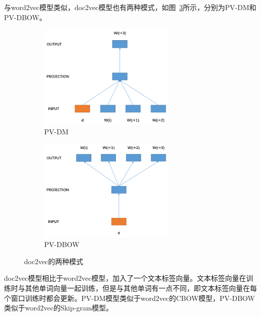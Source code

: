 与word2vec模型类似，doc2vec模型也有两种模式，如图~\ref{fig:doc2vec}所示，分别为PV-DM和PV-DBOW。\par


\begin{figure}[t]
  \begin{subfigure}[t]{0.5\linewidth}  
    \centering
    \includegraphics[width=6.5cm]{dm.png}

    \caption{PV-DM}
    \label{fig:jaccard}
  \end{subfigure}
  \begin{subfigure}[t]{0.5\linewidth}  
    \centering
    \includegraphics[width=6.5cm]{dbow.png}

    \caption{PV-DBOW}
    \label{fig:f1}
    
  \end{subfigure}  
  
  \caption{doc2vec的两种模式}
  \label{fig:doc2vec}
\end{figure}

doc2vec模型相比于word2vec模型，加入了一个文本标签向量。文本标签向量在训练时与其他单词向量一起训练，但是与其他单词有一点不同，即文本标签向量在每个窗口训练时都会更新。PV-DM模型类似于word2vec的CBOW模型，PV-DBOW类似于word2vec的Skip-gram模型。\par



